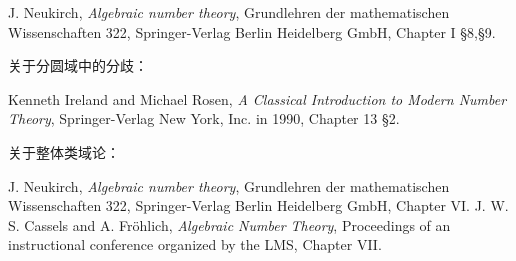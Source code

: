 \begin{references} J. Neukirch, \textit{Algebraic number theory}, Grundlehren der mathematischen Wissenschaften 322, Springer-Verlag Berlin Heidelberg GmbH, Chapter I \S8,\S9.\end{references}
关于分圆域中的分歧：
\begin{references} Kenneth Ireland and Michael Rosen, \textit{A Classical Introduction to Modern Number Theory}, Springer-Verlag New York, Inc. in 1990, Chapter 13 \S2.\end{references}
关于整体类域论：
\begin{references}
 J. Neukirch, \textit{Algebraic number theory}, Grundlehren der mathematischen Wissenschaften 322, Springer-Verlag Berlin Heidelberg GmbH, Chapter VI.
 J. W. S. Cassels and A. Fr\"ohlich, \textit{Algebraic Number Theory}, Proceedings of an instructional conference organized by the LMS, Chapter VII.
\end{references}
